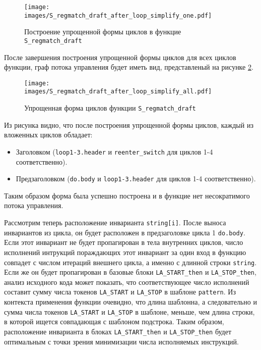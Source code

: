 \begin{figure}
    \centering
    \texttt{[image: images/S\_regmatch\_draft\_after\_loop\_simplify\_one.pdf]}
    \caption{Построение упрощенной формы циклов в функцие \texttt{S\_regmatch\_draft}}
    \label{fig:S_regmatch_darft_loop_simplify_one}
\end{figure}

После завершения построения упрощенной формы циклов для всех циклов функции, граф потока управления будет иметь вид, представленый на рисунке \ref{fig:S_regmatch_darft_loop_simplify_all}.

\begin{figure}
    \centering
    \texttt{[image: images/S\_regmatch\_draft\_after\_loop\_simplify\_all.pdf]}
    \caption{Упрощенная форма циклов функции \texttt{S\_regmatch\_draft}}
    \label{fig:S_regmatch_darft_loop_simplify_all}
\end{figure}

Из рисунка видно, что после построения упрощенной формы циклов, каждый из вложенных циклов обладает:
\begin{itemize}
    \item Заголовком (\texttt{loop1-3.header} и \texttt{reenter\_switch} для циклов 1-4 соответственно).
    \item Предзаголовком (\texttt{do.body} и \texttt{loop1-3.header} для циклов 1-4 соответственно).
\end{itemize}
Таким образом форма была успешно построена и в функцие нет несократимого потока управления.

Рассмотрим теперь расположение инварианта \texttt{string[i]}.
После выноса инвариантов из цикла, он будет расположен в предзаголовке цикла 1 \texttt{do.body}.
Если этот инвариант не будет пропагирован в тела внутренних циклов, число исполнений интрукций пораждающих этот инвариант за один вход в функцию совпадет с числом итераций внешнего цикла, а именно с длинной строки \texttt{string}.
Если же он будет пропагирован в базовые блоки \texttt{LA\_START\_then} и \texttt{LA\_STOP\_then}, анализ исходного кода может показать, что соответствующее число исполнений составит сумму числа токенов \texttt{LA\_START} и \texttt{LA\_STOP} в шаблоне \texttt{pattern}.
Из контекста применения функции очевидно, что длина шаблонна, а следовательно и сумма числа токенов \texttt{LA\_START} и \texttt{LA\_STOP} в шаблоне, меньше, чем длина строки, в которой ищется совпадающая с шаблоном подстрока.
Таким образом, расположение инварианта в блоках \texttt{LA\_START\_then} и \texttt{LA\_STOP\_then} будет оптимальным с точки зрения минимизации числа исполняемых инструкций.

